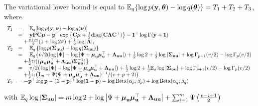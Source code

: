 			The variational lower bound is equal to ${\mathbb E}_q\{\log{p({\bf y}, {\boldsymbol\theta})} - \log{q({\boldsymbol\theta})}\} = T_1 + T_2 + T_3$,
			where
			$$
			\begin{array}{rl}
				T_1 & = \quad {\mathbb E}_q[\log{p({\bf y}, {\boldsymbol\nu})} - \log{q({\boldsymbol\nu})}]                                                                                                                                                  \\
				    & = \quad {\bf y} {\bf P} {\bf C} {\boldsymbol\mu} - {\bf p}^\top \exp{\left\{ {\bf C}{\boldsymbol\mu}+ \frac{1}{2} \text{diag} ({\bf C}{\boldsymbol\Lambda}{\bf C}^\top) \right\}} - {\bf 1}^\top\log \Gamma{({\bf y}+ {\bf1})}                                               \\
				    & \quad + \frac{p + m}{2} (1 + \log{2 \pi}) + \frac{1}{2} \log{|{\boldsymbol\Lambda}|},                                                                                                                                \\
				T_2 & = \quad {\mathbb E}_q \left\{ \log p({\boldsymbol \Sigma}_{{\bf u} {\bf u}}) - \log q({\boldsymbol \Sigma}_{{\bf u} {\bf u}}) \right\}                                                                                                                 \\
				    & = \quad {\mathbb E}_q \big\{ v/2(\log |\Psi| - \log |\Psi + {\boldsymbol \mu}_{\bf u} {\boldsymbol \mu}_{\bf u}^\top + {\boldsymbol \Lambda}_{{\bf u} {\bf u}}|) + \frac{1}{2} \log 2 + \frac{1}{2} \log|{\boldsymbol \Sigma}_{{\bf u} {\bf u}}| + \log \Gamma_{p+1}(v/2) - \log \Gamma_{p}(v/2)    \\
				    & \quad + \frac{1}{2} \text{tr}(({\boldsymbol \mu}_{{\bf u}} {\boldsymbol \mu}_{{\bf u}}^\top + {\boldsymbol \Lambda}_{{\bf u} {\bf u}}) {\boldsymbol \Sigma}_{{\bf u} {\bf u}}^{-1}) \big\}                                                                                                  \\
				    & = \quad v/2\big(\log |\Psi| - \log |\Psi + {\boldsymbol \mu}_{\bf u} {\boldsymbol \mu}_{\bf u}^\top + {\boldsymbol \Lambda}_{{\bf u} {\bf u}}|\big) + \frac{1}{2} \log 2 + \frac{1}{2} {\mathbb E}_q \log |{\boldsymbol \Sigma}_{{\bf u} {\bf u}}| + \log \Gamma_{p+1}(v/2) - \log \Gamma_{p}(v/2) \\
				    & \quad + \frac{1}{2} \text{tr}\big({\bf I}_m + \Psi(\Psi+ {\boldsymbol \mu}_{\bf u} {\boldsymbol \mu}_{\bf u}^\top + {\boldsymbol \Lambda}_{{\bf u} {\bf u}})^{-1}/(v + p + 2)\big)                                                                                        \\
				T_3 & = - {\bf p}^\top \log {\bf p} - ({\bf 1} - {\bf p})^\top \log ({\bf 1} - {\bf p}) - \log \text{Beta} (\alpha_\rho, \beta_\rho) + \log \text{Beta} (\alpha_q, \beta_q)                                                              
			\end{array}
			$$
					
			\noindent with ${\mathbb E}_q \log |{\boldsymbol \Sigma}_{{\bf u} {\bf u}}| = m \log 2 + \log \left | \Psi + {\boldsymbol \mu}_{\bf u} {\boldsymbol \mu}_{\bf u}^\top + {\boldsymbol \Lambda}_{{\bf u} {\bf u}} \right | + \sum_{i=1}^m \Psi \left ( \frac{v - i + 1}{2} \right )$

